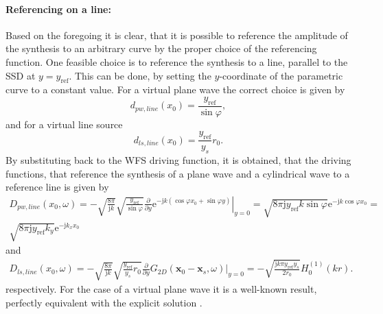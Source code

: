 \documentclass[12pt,a4paper]{article}
\newcommand{\te}{\mathrm{e}}
\newcommand{\ti}{\mathrm{j}}
\newcommand{\sinfi}{\sin\varphi}
\newcommand{\cosfi}{\cos\varphi}
\newcommand{\yref}{y_{\mathrm{ref}}}
\newcommand{\vxo}{\mathbf{x}_0}
\begin{document}
\paragraph{Referencing on a line:\\}
Based on the foregoing it is clear, that it is possible to reference the amplitude of the synthesis to an arbitrary curve by the proper choice of the referencing function. 
One feasible choice is to reference the synthesis to a line, parallel to the SSD at $y=\yref$. This can be done, by setting the $y$-coordinate of the parametric curve to a constant value.
For a virtual plane wave the correct choice is given by
\begin{equation}
d_{pw,line}(x_0) = \frac{\yref}{\sinfi},
\end{equation}
and for a virtual line source 
\begin{equation}
d_{ls,line}(x_0) = \frac{\yref}{y_s} r_0.
\end{equation}
By substituting back to the WFS driving function, it is obtained, that the driving functions, that reference the synthesis of a plane wave and a cylindrical wave to a reference line is given by
\begin{multline}
D_{pw,line}(x_0,\omega) = 
- \sqrt{\frac{8\pi}{\ti k}}\sqrt{\frac{\yref}{\sinfi}} \frac{\partial}{\partial y} \left. \te^{-\ti k (\cosfi x_0 + \sinfi y)} \right|_{y = 0} = 
\sqrt{8\pi \ti \yref k \sinfi}\te^{-\ti k \cosfi x_0 } =\\ 
\sqrt{8\pi \ti \yref k_y }\te^{-\ti k_x x_0 }
\end{multline}
and
\begin{multline}
D_{ls,line}(x_0,\omega) = 
- \sqrt{\frac{8\pi}{\ti k}}\sqrt{\frac{\yref}{y_s} r_0} \frac{\partial}{\partial y} \left. G_{2D}(\vxo -  \mathbf{x}_s,\omega) \right|_{y = 0} =
- \sqrt{\frac{\ti k \pi \yref y_s}{2 r_0}}  H_0^{(1)}( k r ).
\end{multline}
respectively. For the case of a virtual plane wave it is a well-known result, perfectly equivalent with the explicit solution \cite{Ahrens2012}.
\end{document}
